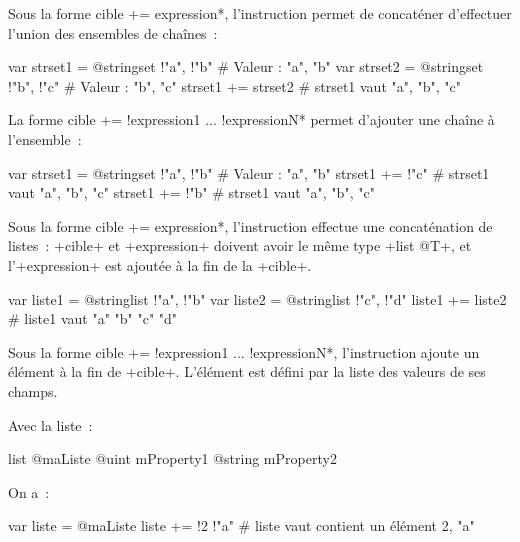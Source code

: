
Sous la forme \ggst*cible += expression*, l'instruction permet de concaténer d'effectuer l'union des ensembles de chaînes~:
\begin{galgas3}
var strset1 = @stringset {!"a", !"b"} # Valeur : "a", "b"
var strset2 = @stringset {!"b", !"c"} # Valeur : "b", "c"
strset1 += strset2 # strset1 vaut "a", "b", "c"
\end{galgas3}

La forme \ggst*cible += !expression1 ... !expressionN* permet d'ajouter une chaîne à l'ensemble~:
\begin{galgas3}
var strset1 = @stringset {!"a", !"b"} # Valeur : "a", "b"
strset1 += !"c" # strset1 vaut "a", "b", "c"
strset1 += !"b" # strset1 vaut "a", "b", "c"
\end{galgas3}




Sous la forme \ggst*cible += expression*, l'instruction effectue une concaténation de listes~: \ggst+cible+ et \ggst+expression+ doivent avoir le même type \ggst+list @T+, et l'\ggst+expression+ est ajoutée à la fin de la \ggst+cible+.

\begin{galgas3}
var liste1 = @stringlist {!"a", !"b"}
var liste2 = @stringlist {!"c", !"d"}
liste1 += liste2 # liste1 vaut "a" "b" "c" "d"
\end{galgas3}



Sous la forme \ggst*cible += !expression1 ... !expressionN*, l'instruction ajoute un élément à la fin de \ggst+cible+. L'élément est défini par la liste des valeurs de ses champs.

Avec la liste~:
\begin{galgas3}
list @maListe {
  @uint mProperty1
  @string mProperty2
}
\end{galgas3}

On a~:

\begin{galgas3}
var liste = @maListe {}
liste += !2 !"a" # liste vaut contient un élément 2, "a"
\end{galgas3}








